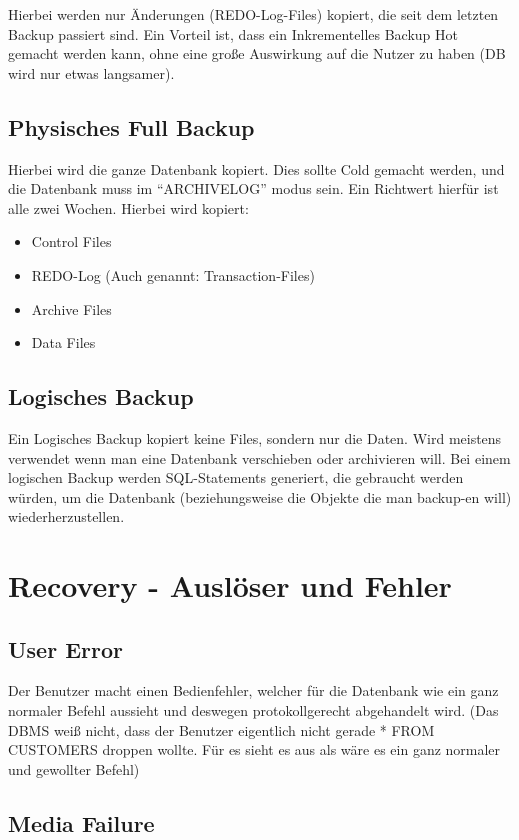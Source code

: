 Hierbei werden nur Änderungen (REDO-Log-Files) kopiert, die seit dem letzten Backup passiert sind. Ein Vorteil ist, dass ein Inkrementelles Backup Hot gemacht werden kann, ohne eine große Auswirkung auf die Nutzer zu haben (DB wird nur etwas langsamer).

\subsection{Physisches Full Backup}

Hierbei wird die ganze Datenbank kopiert. Dies sollte Cold gemacht werden, und die Datenbank muss im “ARCHIVELOG” modus sein. Ein Richtwert hierfür ist alle zwei Wochen. Hierbei wird kopiert:
\begin{itemize}
    \item Control Files
    \item REDO-Log (Auch genannt: Transaction-Files)
    \item Archive Files
    \item Data Files
\end{itemize}

\subsection{Logisches Backup}

Ein Logisches Backup kopiert keine Files, sondern nur die Daten. Wird meistens verwendet wenn man eine Datenbank verschieben oder archivieren will.
Bei einem logischen Backup werden SQL-Statements generiert, die gebraucht werden würden, um die Datenbank (beziehungsweise die Objekte die man backup-en will) wiederherzustellen.

\section{Recovery - Auslöser und Fehler}

\subsection{User Error}

Der Benutzer macht einen Bedienfehler, welcher für die Datenbank wie ein ganz normaler Befehl aussieht und deswegen protokollgerecht abgehandelt wird. (Das DBMS weiß nicht, dass der Benutzer eigentlich nicht gerade * FROM CUSTOMERS droppen wollte. Für es sieht es aus als wäre es ein ganz normaler und gewollter Befehl)

\subsection{Media Failure}

